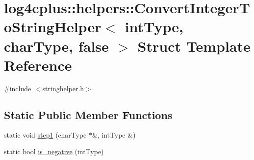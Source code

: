\hypertarget{structlog4cplus_1_1helpers_1_1ConvertIntegerToStringHelper_3_01intType_00_01charType_00_01false_01_4}{\section{log4cplus\-:\-:helpers\-:\-:Convert\-Integer\-To\-String\-Helper$<$ int\-Type, char\-Type, false $>$ Struct Template Reference}
\label{structlog4cplus_1_1helpers_1_1ConvertIntegerToStringHelper_3_01intType_00_01charType_00_01false_01_4}
}


{\ttfamily \#include $<$stringhelper.\-h$>$}

\subsection*{Static Public Member Functions}
\begin{DoxyCompactItemize}
\item 
static void \hyperlink{structlog4cplus_1_1helpers_1_1ConvertIntegerToStringHelper_3_01intType_00_01charType_00_01false_01_4_a552ef20165d6a2a66cfaab50867f3d88}{step1} (char\-Type $\ast$\&, int\-Type \&)
\item 
static bool \hyperlink{structlog4cplus_1_1helpers_1_1ConvertIntegerToStringHelper_3_01intType_00_01charType_00_01false_01_4_a752412d4f2eb9d5384f5d328c0406532}{is\-\_\-negative} (int\-Type)
\end{DoxyCompactItemize}


